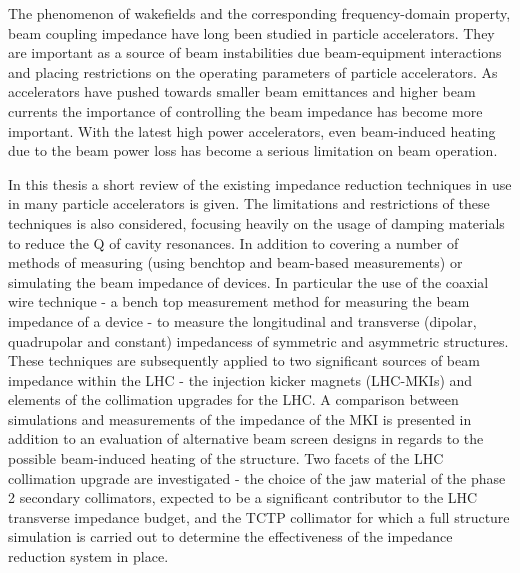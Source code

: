 The phenomenon of wakefields and the corresponding frequency-domain property, beam coupling impedance have long been studied in particle accelerators. They are important as a source of beam instabilities due beam-equipment interactions and placing restrictions on the operating parameters of particle accelerators. As accelerators have pushed towards smaller beam emittances and higher beam currents the importance of controlling the beam impedance has become more important. With the latest high power accelerators, even beam-induced heating due to the beam power loss has become a serious limitation on beam operation.

In this thesis a short review of the existing impedance reduction techniques in use in many particle accelerators is given. The limitations and restrictions of these techniques is also considered, focusing heavily on the usage of damping materials to reduce the Q of cavity resonances. In addition to covering a number of methods of measuring (using benchtop and beam-based measurements) or simulating the beam impedance of devices. In particular the use of the coaxial wire technique - a bench top measurement method for measuring the beam impedance of a device - to measure the longitudinal and transverse (dipolar, quadrupolar and constant) impedancess of symmetric and asymmetric structures. These techniques are subsequently applied to two significant sources of beam impedance within the LHC - the injection kicker magnets (LHC-MKIs) and elements of the collimation upgrades for the LHC. A comparison between simulations and measurements of the impedance of the MKI is presented in addition to an evaluation of alternative beam screen designs in regards to the possible beam-induced heating of the structure. Two facets of the LHC collimation upgrade are investigated - the choice of the jaw material of the phase 2 secondary collimators, expected to be a significant contributor to the LHC transverse impedance budget, and the TCTP collimator for which a full structure simulation is carried out to determine the effectiveness of the impedance reduction system in place.

